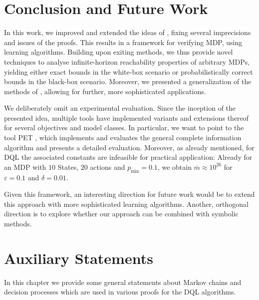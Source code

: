 \documentclass{article}
\newcommand{\delay}{{\overline{m}}}
\begin{document}
 	\section{Conclusion and Future Work} \label{sec:conclusion}

In this work, we improved and extended the ideas of \cite{DBLP:conf/atva/BrazdilCCFKKPU14}, fixing several imprecisions and issues of the proofs.
This results in a framework for verifying MDP, using learning algorithms.
Building upon exiting methods, we thus provide novel techniques to analyse infinite-horizon reachability properties of arbitrary MDPs, yielding either exact bounds in the white-box scenario or probabilistically correct bounds in the black-box scenario.
Moreover, we presented a generalization of the methods of \cite{DBLP:conf/atva/BrazdilCCFKKPU14}, allowing for further, more sophisticated applications.

We deliberately omit an experimental evaluation.
Since the inception of the presented idea, multiple tools have implemented variants and extensions thereof for several objectives and model classes.
In particular, we want to point to the tool PET \cite{DBLP:conf/atva/Meggendorfer22,DBLP:conf/cav/MeggendorferW24}, which implements and evaluates the general complete information algorithm and presents a detailed evaluation.
Moreover, as already mentioned, for DQL the associated constants are infeasible for practical application:
Already for an MDP with $10$ States, $20$ actions and $p_{\min} = 0.1$, we obtain $\delay \approx 10^{26}$ for $\varepsilon = 0.1$ and $\delta = 0.01$.

Given this framework, an interesting direction for future work would be to extend this approach with more sophisticated learning algorithms.
Another, orthogonal direction is to explore whether our approach can be combined with symbolic methods.

	
	\appendix
	\section{Auxiliary Statements} \label{sec:appendix:auxiliary}

In this chapter we provide some general statements about Markov chains and decision processes which are used in various proofs for the DQL algorithms.
\end{document}
